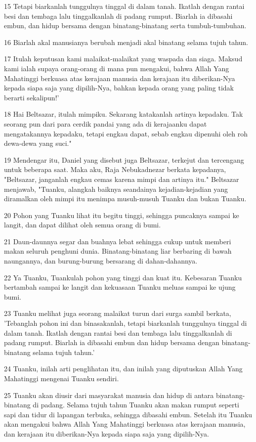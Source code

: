 \par 15 Tetapi biarkanlah tunggulnya tinggal di dalam tanah. Ikatlah dengan rantai besi dan tembaga lalu tinggalkanlah di padang rumput. Biarlah ia dibasahi embun, dan hidup bersama dengan binatang-binatang serta tumbuh-tumbuhan.
\par 16 Biarlah akal manusianya berubah menjadi akal binatang selama tujuh tahun.
\par 17 Itulah keputusan kami malaikat-malaikat yang waspada dan siaga. Maksud kami ialah supaya orang-orang di mana pun mengakui, bahwa Allah Yang Mahatinggi berkuasa atas kerajaan manusia dan kerajaan itu diberikan-Nya kepada siapa saja yang dipilih-Nya, bahkan kepada orang yang paling tidak berarti sekalipun!'
\par 18 Hai Beltsazar, itulah mimpiku. Sekarang katakanlah artinya kepadaku. Tak seorang pun dari para cerdik pandai yang ada di kerajaanku dapat mengatakannya kepadaku, tetapi engkau dapat, sebab engkau dipenuhi oleh roh dewa-dewa yang suci."
\par 19 Mendengar itu, Daniel yang disebut juga Beltsazar, terkejut dan tercengang untuk beberapa saat. Maka aku, Raja Nebukadnezar berkata kepadanya, "Beltsazar, janganlah engkau cemas karena mimpi dan artinya itu." Beltsazar menjawab, "Tuanku, alangkah baiknya seandainya kejadian-kejadian yang diramalkan oleh mimpi itu menimpa musuh-musuh Tuanku dan bukan Tuanku.
\par 20 Pohon yang Tuanku lihat itu begitu tinggi, sehingga puncaknya sampai ke langit, dan dapat dilihat oleh semua orang di bumi.
\par 21 Daun-daunnya segar dan buahnya lebat sehingga cukup untuk memberi makan seluruh penghuni dunia. Binatang-binatang liar berbaring di bawah naungannya, dan burung-burung bersarang di dahan-dahannya.
\par 22 Ya Tuanku, Tuankulah pohon yang tinggi dan kuat itu. Kebesaran Tuanku bertambah sampai ke langit dan kekuasaan Tuanku meluas sampai ke ujung bumi.
\par 23 Tuanku melihat juga seorang malaikat turun dari surga sambil berkata, 'Tebanglah pohon ini dan binasakanlah, tetapi biarkanlah tunggulnya tinggal di dalam tanah. Ikatlah dengan rantai besi dan tembaga lalu tinggalkanlah di padang rumput. Biarlah ia dibasahi embun dan hidup bersama dengan binatang-binatang selama tujuh tahun.'
\par 24 Tuanku, inilah arti penglihatan itu, dan inilah yang diputuskan Allah Yang Mahatinggi mengenai Tuanku sendiri.
\par 25 Tuanku akan diusir dari masyarakat manusia dan hidup di antara binatang-binatang di padang. Selama tujuh tahun Tuanku akan makan rumput seperti sapi dan tidur di lapangan terbuka, sehingga dibasahi embun. Setelah itu Tuanku akan mengakui bahwa Allah Yang Mahatinggi berkuasa atas kerajaan manusia, dan kerajaan itu diberikan-Nya kepada siapa saja yang dipilih-Nya.
